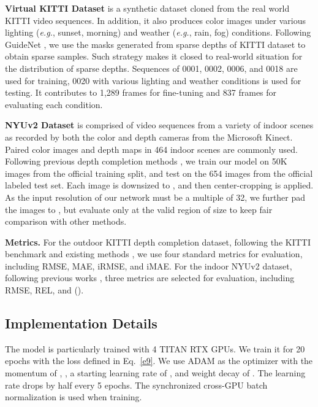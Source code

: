 \documentclass[runningheads]{llncs}
\begin{document}
\noindent \textbf{Virtual KITTI Dataset} \cite{gaidon2016virtual} is a
synthetic dataset cloned from the
real world KITTI video sequences. In addition, it also produces color images under various lighting (\emph{e.g.}, sunset, morning) and weather (\emph{e.g.}, rain, fog) conditions. Following GuideNet \cite{tang2020learning}, we use the masks generated from sparse depths of KITTI dataset to obtain sparse samples. Such strategy makes it closed to real-world situation for the distribution of sparse depths.
Sequences of 0001, 0002, 0006, and 0018 are used for training, 0020 with various lighting and weather conditions is used for testing. It contributes to 1,289 frames for fine-tuning and 837 frames for evaluating each condition.

\noindent \textbf{NYUv2 Dataset} \cite{silberman2012indoor} is comprised of video sequences from a variety of indoor scenes as recorded by both the color and depth cameras from the Microsoft Kinect. Paired color images and depth maps in 464 indoor scenes are commonly used. Following previous depth completion methods \cite{ma2018self,chen2019learning,Qiu_2019_CVPR,park2020nonlocal,tang2020learning}, we train our model on 50K images from the official training split, and test on the 654 images from the official labeled test set. Each image is downsized to , and then  center-cropping is applied. As the input resolution of our network must be a multiple of 32, we further pad the images to , but evaluate only at the valid region of size  to keep fair comparison with other methods.

\noindent \textbf{Metrics.} For the outdoor KITTI depth completion dataset, following the KITTI benchmark and existing methods \cite{park2020nonlocal,tang2020learning,liu2021fcfr,hu2020PENet}, we use four standard metrics for evaluation, including RMSE, MAE, iRMSE, and iMAE. For the indoor NYUv2 dataset, following previous works \cite{chen2019learning,Qiu_2019_CVPR,park2020nonlocal,tang2020learning,liu2021fcfr}, three metrics are selected for evaluation, including RMSE, REL, and  ().

\subsection{Implementation Details}
The model is particularly trained with 4 TITAN RTX GPUs. We train it for 20 epochs with the loss defined in Eq.~\ref{e9}. We use ADAM \cite{Kingma2014Adam} as the optimizer with the momentum of , , a starting learning rate of , and weight decay of . The learning rate drops by half every 5 epochs. The synchronized cross-GPU batch normalization \cite{ioffe2015batch,zhang2018context} is used when training.
\end{document}
